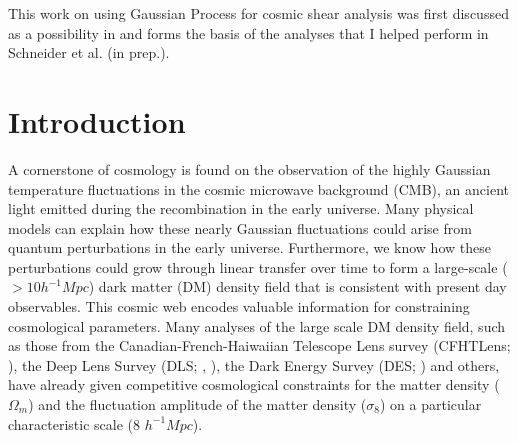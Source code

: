  
This work on using Gaussian Process for cosmic shear analysis 
was first discussed as a possibility in  \citep{Schneider2014}  and 
forms the basis of the analyses that I helped perform 
in Schneider et al. (in prep.). 

\section{Introduction} 

A cornerstone of cosmology is found on the 
observation of the highly Gaussian temperature fluctuations in the cosmic microwave 
background (CMB), an ancient light emitted during the recombination in the early
universe. Many physical models can explain how these
nearly Gaussian fluctuations could arise from quantum perturbations in the 
early universe. Furthermore, we know how these perturbations could grow
through linear transfer over time to form a large-scale ($> 10 h^{-1} Mpc$) 
dark matter (DM) density field that is consistent with present
day observables. 
This cosmic web encodes valuable information for constraining cosmological
parameters. Many analyses of the large scale DM density field, such as those from
the Canadian-French-Haiwaiian Telescope Lens survey (CFHTLens;
\citealt{Kilbinger2013}), the Deep Lens Survey
(DLS; \citealt{Jee2013a}, \citealt{Wittman2002}), the Dark Energy Survey (DES; \citealt{Abbott2016}) and others, 
have already given competitive cosmological constraints for 
 the matter density ($\Omega_m$) and the fluctuation amplitude 
of the matter density ($\sigma_8$) on a particular characteristic scale (8
$h^{-1} Mpc$). 


